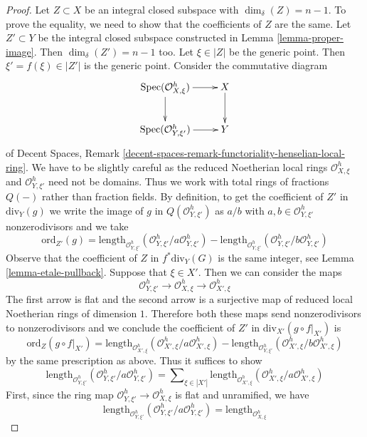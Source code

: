 \documentclass{stacks-project}
\theoremstyle{plain}
\theoremstyle{definition}
\theoremstyle{remark}
\numberwithin{equation}{subsection}
\def\Spec{\mathop{\mathrm{Spec}}}
\begin{document}
\begin{proof}
\medskip\noindent
Let $Z \subset X$ be an integral closed subspace with $\dim_\delta(Z) = n - 1$.
To prove the equality, we need to show that the coefficients
of $Z$ are the same. Let $Z' \subset Y$ be the integral closed
subspace constructed in Lemma \ref{lemma-proper-image}.
Then $\dim_\delta(Z') = n - 1$ too. Let $\xi \in |Z|$ be the generic point.
Then $\xi' = f(\xi) \in |Z'|$ is the generic point.
Consider the commutative diagram
$$
\xymatrix{
\Spec(\mathcal{O}_{X, \xi}^h) \ar[r] \ar[d] & X \ar[d] \\
\Spec(\mathcal{O}_{Y, \xi'}^h) \ar[r] & Y
}
$$
of Decent Spaces, Remark
\ref{decent-spaces-remark-functoriality-henselian-local-ring}.
We have to be slightly careful as the reduced Noetherian local rings
$\mathcal{O}_{X, \xi}^h$ and $\mathcal{O}_{Y, \xi'}^h$ need not be domains.
Thus we work with total rings of fractions $Q(-)$ rather than fraction fields.
By definition, to get the coefficient of $Z'$ in $\text{div}_Y(g)$
we write the image of $g$ in $Q(\mathcal{O}_{Y, \xi'}^h)$
as $a/b$ with $a, b \in \mathcal{O}_{Y, \xi'}^h$ nonzerodivisors
and we take
$$
\text{ord}_{Z'}(g) =
\text{length}_{\mathcal{O}_{Y, \xi'}^h}
(\mathcal{O}_{Y, \xi'}^h/a \mathcal{O}_{Y, \xi'}^h) -
\text{length}_{\mathcal{O}_{Y, \xi'}^h}
(\mathcal{O}_{Y, \xi'}^h/b \mathcal{O}_{Y, \xi'}^h)
$$
Observe that the coefficient of $Z$ in $f^*\text{div}_Y(G)$
is the same integer, see Lemma \ref{lemma-etale-pullback}.
Suppose that $\xi \in X'$. Then we can consider the maps
$$
\mathcal{O}_{Y, \xi'}^h \to
\mathcal{O}_{X, \xi}^h \to
\mathcal{O}_{X', \xi}^h
$$
The first arrow is flat and the second arrow is a surjective
map of reduced local Noetherian rings of dimension $1$.
Therefore both these maps send nonzerodivisors to nonzerodivisors
and we conclude the coefficient of $Z'$ in $\text{div}_{X'}(g \circ f|_{X'})$
is
$$
\text{ord}_Z(g \circ f|_{X'}) =
\text{length}_{\mathcal{O}_{X', \xi}^h}
(\mathcal{O}_{X', \xi}^h/a \mathcal{O}_{X', \xi}^h) -
\text{length}_{\mathcal{O}_{Y, \xi'}^h}
(\mathcal{O}_{X', \xi}^h/b \mathcal{O}_{X', \xi}^h)
$$
by the same prescription as above. Thus it suffices to show
$$
\text{length}_{\mathcal{O}_{Y, \xi'}^h}
(\mathcal{O}_{Y, \xi'}^h/a \mathcal{O}_{Y, \xi'}^h) =
\sum\nolimits_{\xi \in |X'|}
\text{length}_{\mathcal{O}_{X', \xi}^h}
(\mathcal{O}_{X', \xi}^h/a \mathcal{O}_{X', \xi}^h)
$$
First, since the ring map $\mathcal{O}_{Y, \xi'}^h \to
\mathcal{O}_{X, \xi}^h$ is flat and unramified, we have
$$
\text{length}_{\mathcal{O}_{Y, \xi'}^h}
(\mathcal{O}_{Y, \xi'}^h/a \mathcal{O}_{Y, \xi'}^h) =
\text{length}_{\mathcal{O}_{X, \xi}^h}
$$
\end{proof}
\end{document}
